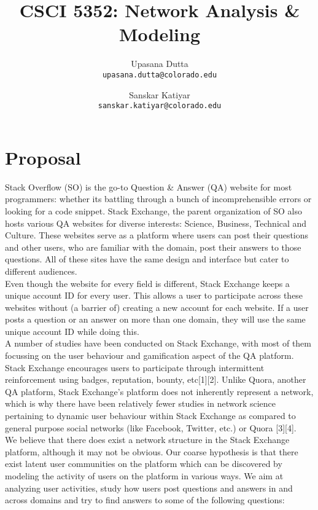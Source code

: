 \documentclass[11pt,a4paper,final]{article}
\author{
  Upasana Dutta\\
  \texttt{upasana.dutta@colorado.edu}
  \and
  Sanskar Katiyar\\
  \texttt{sanskar.katiyar@colorado.edu}
}
\date{}
\title{CSCI 5352: Network Analysis \& Modeling}
\begin{document}
\maketitle

\section{Proposal}
Stack Overflow (SO) is the go-to Question \& Answer (QA) website for most programmers: whether its battling through a bunch of incomprehensible errors or looking for a code snippet. Stack Exchange, the parent organization of SO also hosts various QA websites for diverse interests: Science, Business, Technical and Culture. These websites serve as a platform where users can post their questions and other users, who are familiar with the domain, post their answers to those questions. All of these sites have the same design and interface but cater to different audiences. \\

Even though the website for every field is different, Stack Exchange keeps a unique account ID for every user. This allows a user to participate across these websites without (a barrier of) creating a new account for each website. If a user posts a question or an answer on more than one domain, they will use the same unique account ID while doing this.\\

A number of studies have been conducted on Stack Exchange, with most of them focussing on the user behaviour and gamification aspect of the QA platform. Stack Exchange encourages users to participate through intermittent reinforcement using badges, reputation, bounty, etc[1][2]. Unlike Quora, another QA platform, Stack Exchange's platform does not inherently represent a network, which is why there have been relatively fewer studies in network science pertaining to dynamic user behaviour within Stack Exchange as compared to general purpose social networks (like Facebook, Twitter, etc.) or Quora [3][4].\\

We believe that there does exist a network structure in the Stack Exchange platform, although it may not be obvious. Our coarse hypothesis is that there exist latent user communities on the platform which can be discovered by modeling the activity of users on the platform in various ways. We aim at analyzing user activities, study how users post questions and answers in and across domains and try to find answers to some of the following questions:
\end{document}
